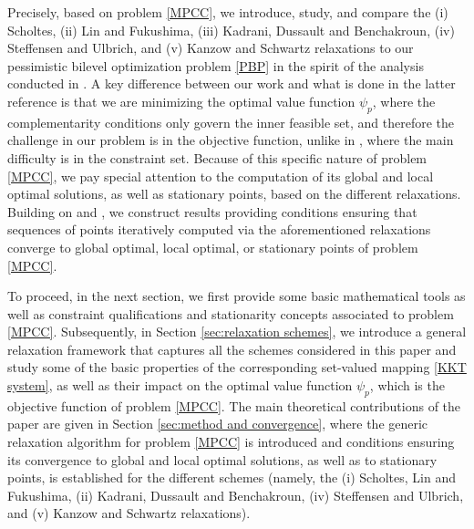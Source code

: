 Precisely, based on problem \eqref{MPCC}, we introduce, study, and compare the (i) Scholtes, (ii) Lin and Fukushima, (iii) Kadrani, Dussault and Benchakroun, (iv) Steffensen and Ulbrich, and (v) Kanzow and Schwartz relaxations to our pessimistic bilevel optimization problem \eqref{PBP} in the spirit of the analysis conducted in \cite{HoheiselEtAlComparison2013}. A key difference between our work and what is done in the latter reference is that we are minimizing the optimal value function $\psi_p$, where the complementarity conditions only govern the inner feasible set, and therefore the challenge in our problem is in the objective function, unlike in \cite{HoheiselEtAlComparison2013}, where the main difficulty is in the constraint set. %
Because of this specific nature of problem \eqref{MPCC}, we pay special attention to the computation of its global and local optimal solutions, as well as stationary points, based on the different relaxations. Building on \cite{BNZ} and \cite{HoheiselEtAlComparison2013}, we construct results providing conditions ensuring that sequences of points iteratively computed via the aforementioned relaxations converge to  global optimal, local optimal, or stationary points of problem \eqref{MPCC}. 

To proceed, in the next section, we first provide some basic mathematical tools as well as constraint qualifications and stationarity concepts associated to problem \eqref{MPCC}. Subsequently, in Section \ref{sec:relaxation schemes}, we introduce a general relaxation framework that captures all the schemes considered in this paper and study some of the basic properties of the corresponding set-valued mapping \eqref{KKT system}, as well as their impact on the optimal value function $\psi_p$, which is the objective function of problem \eqref{MPCC}. %
The main theoretical contributions of the paper are given in Section \ref{sec:method and convergence}, where the generic relaxation algorithm for problem \eqref{MPCC} is introduced and conditions ensuring its convergence to global and local optimal solutions, as well as to stationary points, is established for the different schemes (namely, the (i) Scholtes, Lin and Fukushima, (ii) Kadrani, Dussault and Benchakroun, (iv) Steffensen and Ulbrich, and (v) Kanzow and Schwartz relaxations). %

